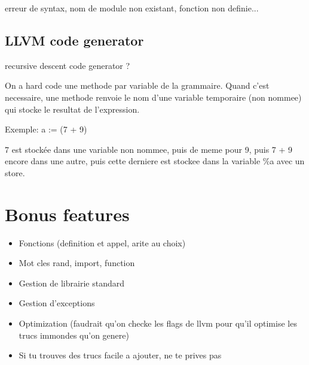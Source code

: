 \documentclass[12pt]{report}
\begin{document}
 erreur de syntax, nom de module non existant, fonction non definie...

\section{LLVM code generator}

recursive descent code generator ?

On a hard code une methode par variable de la grammaire.
Quand c'est necessaire, une methode renvoie le nom d'une variable temporaire (non nommee)
qui stocke le resultat de l'expression.

Exemple: a := (7 + 9)

7 est stockée dans une variable non nommee, puis de meme pour 9, puis 7 + 9 encore dans une autre, puis cette derniere est stockee
dans la variable \%a avec un store.

\chapter{Bonus features}

\begin{itemize}
\item Fonctions (definition et appel, arite au choix)
\item Mot cles rand, import, function
\item Gestion de librairie standard
\item Gestion d'exceptions
\item Optimization (faudrait qu'on checke les flags de llvm pour qu'il optimise les trucs immondes qu'on genere)
\item Si tu trouves des trucs facile a ajouter, ne te prives pas
\end{itemize}
\end{document}
